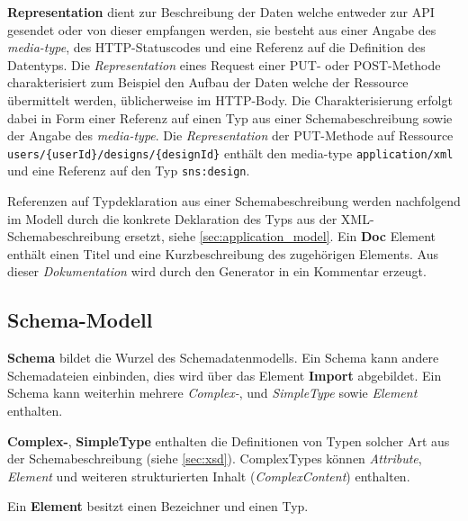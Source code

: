 \textbf{Representation} dient zur Beschreibung der Daten welche entweder zur API gesendet oder von dieser empfangen werden, sie besteht aus einer Angabe des \emph{media-type}, des HTTP-Statuscodes und eine Referenz auf die Definition des Datentyps. Die \emph{Representation} eines Request einer PUT- oder POST-Methode charakterisiert zum Beispiel den Aufbau der Daten welche der Ressource übermittelt werden, üblicherweise im HTTP-Body. Die Charakterisierung erfolgt dabei in Form einer Referenz auf einen Typ aus einer Schemabeschreibung sowie der Angabe des \emph{media-type}. Die \emph{Representation} der PUT-Methode auf Ressource \texttt{users/\{userId\}/designs/\{designId\}} enthält den media-type \texttt{application/xml} und eine Referenz auf den Typ \texttt{sns:design}. 

Referenzen auf Typdeklaration aus einer Schemabeschreibung werden nachfolgend im Modell durch die konkrete Deklaration des Typs aus der XML-Schemabeschreibung ersetzt, siehe \cref{sec:application_model}. Ein \textbf{Doc} Element enthält einen Titel und eine Kurzbeschreibung des zugehörigen Elements. Aus dieser \emph{Dokumentation} wird durch den Generator in ein Kommentar erzeugt.

\subsection{Schema-Modell}
\label{sec:schema_model}

\textbf{Schema} bildet die Wurzel des Schemadatenmodells. Ein Schema kann andere Schemadateien einbinden, dies wird über das Element \textbf{Import} abgebildet. Ein Schema kann weiterhin mehrere \emph{Complex-}, und \emph{SimpleType} sowie \emph{Element} enthalten.

\textbf{Complex-}, \textbf{SimpleType} enthalten die Definitionen von Typen solcher Art aus der Schemabeschreibung (siehe \cref{sec:xsd}). ComplexTypes können \emph{Attribute}, \emph{Element} und weiteren strukturierten Inhalt (\emph{ComplexContent}) enthalten.

Ein \textbf{Element} besitzt einen Bezeichner und einen Typ.

